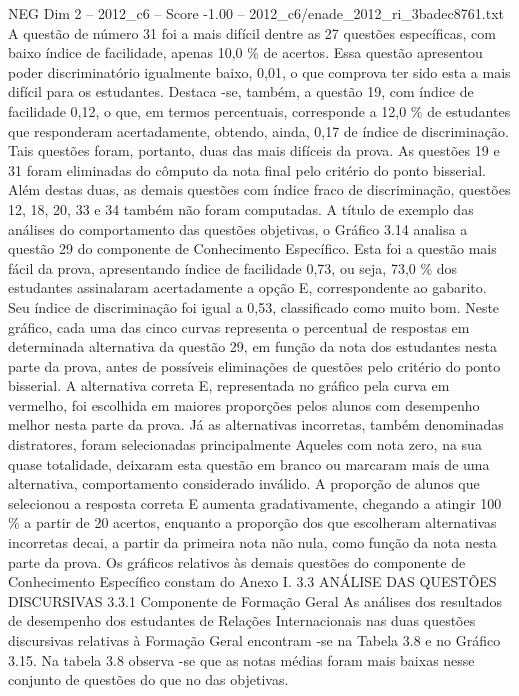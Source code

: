 \begin{textsample}{NEG Dim 2 – 2012\_c6 – Score -1.00 – 2012\_c6/enade\_2012\_ri\_3badec8761.txt}
A questão de número 31 foi a mais difícil dentre as 27 questões específicas, com baixo índice de facilidade, apenas 10,0 \% de acertos.
Essa questão apresentou poder discriminatório igualmente baixo, 0,01, o que comprova ter sido esta a mais difícil para os estudantes.
Destaca -se, também, a questão 19, com índice de facilidade 0,12, o que, em termos percentuais, corresponde a 12,0 \% de estudantes que responderam acertadamente, obtendo, ainda, 0,17 de índice de discriminação.
Tais questões foram, portanto, duas das mais difíceis da prova.
As questões 19 e 31 foram eliminadas do cômputo da nota final pelo critério do ponto bisserial.
Além destas duas, as demais questões com índice fraco de discriminação, questões 12, 18, 20, 33 e 34 também não foram computadas.
A título de exemplo das análises do comportamento das questões objetivas, o Gráfico 3.14 analisa a questão 29 do componente de Conhecimento Específico.
Esta foi a questão mais fácil da prova, apresentando índice de facilidade 0,73, ou seja, 73,0 \% dos estudantes assinalaram acertadamente a opção E, correspondente ao gabarito.
Seu índice de discriminação foi igual a 0,53, classificado como muito bom.
Neste gráfico, cada uma das cinco curvas representa o percentual de respostas em determinada alternativa da questão 29, em função da nota dos estudantes nesta parte da prova, antes de possíveis eliminações de questões pelo critério do ponto bisserial.
A alternativa correta E, representada no gráfico pela curva em vermelho, foi escolhida em maiores proporções pelos alunos com desempenho melhor nesta parte da prova.
Já as alternativas incorretas, também denominadas distratores, foram selecionadas principalmente Aqueles com nota zero, na sua quase totalidade, deixaram esta questão em branco ou marcaram mais de uma alternativa, comportamento considerado inválido.
A proporção de alunos que selecionou a resposta correta E aumenta gradativamente, chegando a atingir 100 \% a partir de 20 acertos, enquanto a proporção dos que escolheram alternativas incorretas decai, a partir da primeira nota não nula, como função da nota nesta parte da prova.
Os gráficos relativos às demais questões do componente de Conhecimento Específico constam do Anexo I. 3.3 ANÁLISE DAS QUESTÕES DISCURSIVAS 3.3.1 Componente de Formação Geral As análises dos resultados de desempenho dos estudantes de Relações Internacionais nas duas questões discursivas relativas à Formação Geral encontram -se na Tabela 3.8 e no Gráfico 3.15.
Na tabela 3.8 observa -se que as notas médias foram mais baixas nesse conjunto de questões do que no das objetivas.

\end{textsample}
